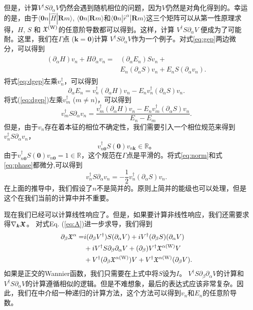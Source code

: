 但是，计算$V^{\dagger}S\partial_{\alpha}V$仍然会遇到随机相位的问题，因为$V$仍然是对角化得到的。幸运的是，由于$\langle\boldsymbol{0}n|\hat{H}|\boldsymbol{R}m\rangle$,
$\langle\boldsymbol{0}n|\boldsymbol{R}m\rangle$和$\langle\boldsymbol{0}n|\hat{r}^{\alpha}|\boldsymbol{R}m\rangle$这三个矩阵可以从第一性原理求得，$H$, $S$ 和 $\mathfrak{X}^{(\text{W})}$的任意阶导数都可以得到。这样，计算 $V^{\dagger}S\partial_{\alpha}V$ \cite{van2007computation}便成为了可能耐。这里，我们在$\Gamma$点 ($\boldsymbol{k}=\boldsymbol{0}$)计算
$V^{\dagger}S\partial_{\alpha}V$作为一个例子。对式\ref{eq:gep}两边微分，可以得到
\begin{align}
\begin{split}
(\partial_\alpha H)v_n+H\partial_\alpha v_n = & (\partial_\alpha E_n)Sv_n+\\
& E_n(\partial_\alpha S)v_n+E_n S(\partial_\alpha v_n).\label{eq:dgep}
\end{split}
\end{align}
将式\ref{eq:dgep}左乘$v_{n}^{\dagger}$，可以得到
\[
\partial_\alpha E_{n}=v_{n}^{\dagger}(\partial_\alpha H) v_{n}-E_{n}v_{n}^{\dagger}(\partial_\alpha S)v_{n}.
\]
将式(\ref{eq:dgep})左乘$v_{m}^{\dagger}$ ($m\ne n$)，可以得到
\[
v_{m}^{\dagger}S\partial_\alpha v_{n}=\frac{v_{m}^{\dagger}(\partial_\alpha H)v_{n}-E_{n}v_{m}^{\dagger}(\partial_\alpha S)v_{n}}{E_n-E_m}.
\]
但是，由于$v_{n}$存在着本征的相位不确定性，我们需要引入一个相位规范来得到$v_{n}^{\dagger}S \partial_\alpha v_{n}$，
\begin{equation}
v_{n\boldsymbol{0}}^{\dagger}S(\boldsymbol{0})v_{n\boldsymbol{k}}\in\mathbb{R}。\label{eq:phase}
\end{equation}
由于$v_{n\boldsymbol{0}}^{\dagger}S(\boldsymbol{0})v_{n\boldsymbol{0}}=1\in\mathbb{R}$，这个规范在$\Gamma$点是平滑的。将式\ref{eq:norm}和式\ref{eq:phase}都微分,可以得到
\[
v_{n}^{\dagger}S\partial_\alpha v_n=-\frac{1}{2}v_{n}^{\dagger}(\partial_\alpha S)v_n.
\]
在上面的推导中，我们假设了$n$不是简并的。原则上简并的能级也可以处理\cite{andrew1998computation}，但是这个在我们当前的计算中并不重要。

现在我们已经可以计算线性响应了。但是，如果要计算非线性响应，我们还需要求得$\nabla_{\boldsymbol{k}}\boldsymbol{\mathfrak{X}}$。 对式Eq. (\ref{eq:A})进一步求导，我们得到
\begin{equation}
\begin{split}
\partial_{\beta}\mathfrak{X}^{\alpha}  = &i(\partial_{\beta}V^{\dagger})S(\partial_{\alpha}V)+iV^{\dagger}(\partial_{\beta}S)(\partial_{\alpha}V)\\
&+iV^{\dagger}S\partial_{\beta}\partial_{\alpha}V+(\partial_{\beta})V^{\dagger}\mathfrak{X}^{\alpha(\text{W})}V\\
&+V^{\dagger}(\partial_{\beta}\mathfrak{X}^{\alpha(\text{W})})V+V^{\dagger}\mathfrak{X}^{\alpha(\text{W})}(\partial_{\beta}V).
\end{split}
\end{equation}
如果是正交的Wannier函数\cite{wang_first-principles_2017}，我们只需要在上式中将$S$设为$I$。 $V^{\dagger}S\partial_{\beta}\partial_{\alpha}V$的计算和$V^{\dagger}S\partial_{\alpha}V$的计算遵循相似的逻辑。但是不难想象，最后的表达式应该非常复杂。因此，我们在中介绍一种递归的计算方法，这个方法可以得到$v_n$和$E_{n}$的任意阶导数。


